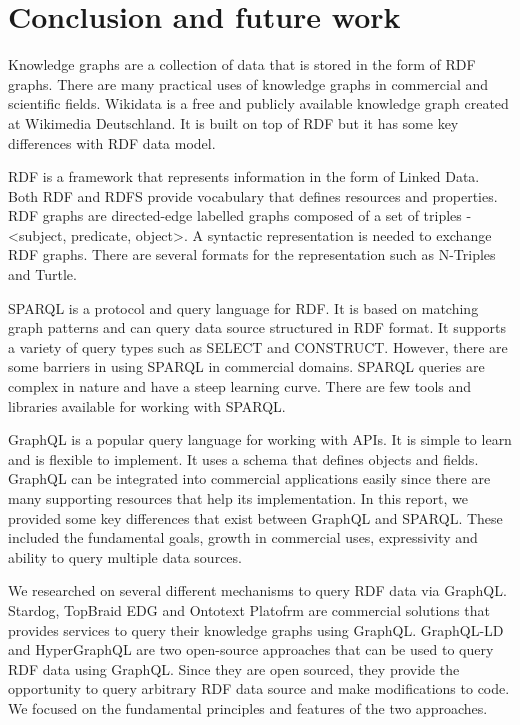 \chapter{Conclusion and future work}
\label{ch:6}

Knowledge graphs are a collection of data that is stored in the form of RDF graphs. There are many practical uses of knowledge graphs in commercial and scientific fields. Wikidata is a free and publicly available knowledge graph created at Wikimedia Deutschland. It is built on top of RDF but it has some key differences with RDF data model. 

RDF is a framework that represents information in the form of Linked Data. Both RDF and RDFS provide vocabulary that defines resources and properties. RDF graphs are directed-edge labelled graphs composed of a set of triples - <subject, predicate, object>. A syntactic representation is needed to exchange RDF graphs. There are several formats for the representation such as N-Triples and Turtle.

SPARQL is a protocol and query language for RDF. It is based on matching graph patterns and can query data source structured in RDF format. It supports a variety of query types such as SELECT and CONSTRUCT. However, there are some barriers in using SPARQL in commercial domains. SPARQL queries are complex in nature and have a steep learning curve. There are few tools and libraries available for working with SPARQL.

GraphQL is a popular query language for working with APIs. It is simple to learn and is flexible to implement. It uses a schema that defines objects and fields. GraphQL can be integrated into commercial applications easily since there are many supporting resources that help its implementation. In this report, we provided some key differences that exist between GraphQL and SPARQL. These included the fundamental goals, growth in commercial uses, expressivity and ability to query multiple data sources.

We researched on several different mechanisms to query RDF data via GraphQL. Stardog, TopBraid EDG and Ontotext Platofrm are commercial solutions that provides services to query their knowledge graphs using GraphQL. GraphQL-LD and HyperGraphQL are two open-source approaches that can be used to query RDF data using GraphQL. Since they are open sourced, they provide the opportunity to query arbitrary RDF data source and make modifications to code. We focused on the fundamental principles and features of the two approaches.

